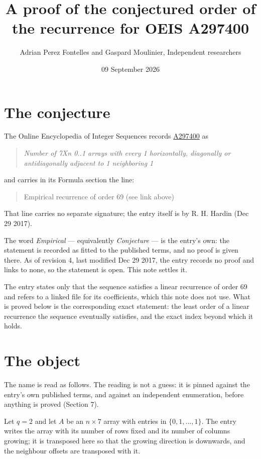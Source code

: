 \documentclass[11pt]{article}
\title{A proof of the conjectured order of the recurrence for OEIS A297400}
\author{Adrian Perez Fontelles and Gaspard Moulinier, Independent researchers}
\date{09 September 2026}
\theoremstyle{definition}
\begin{document}
\maketitle
\section{The conjecture}

The Online Encyclopedia of Integer Sequences records \href{https://oeis.org/A297400}{A297400} as

\begin{quote}\itshape Number of 7Xn 0..1 arrays with every 1 horizontally, diagonally or antidiagonally adjacent to 1 neighboring 1\end{quote}

and carries in its Formula section the line:

\begin{quote}\ttfamily Empirical recurrence of order 69 (see link above)\end{quote}

That line carries no separate signature; the entry itself is by R. H. Hardin (Dec 29 2017).

The word {\itshape Empirical} --- equivalently {\itshape Conjecture} --- is the entry's own: the statement is recorded as fitted to the published terms, and no proof is given there. As of revision 4, last modified Dec 29 2017, the entry records no proof and links to none, so the statement is open. This note settles it.

The entry states only that the sequence satisfies a linear recurrence of order $69$ and refers to a linked file for its coefficients, which this note does not use. What is proved below is the corresponding exact statement: the least order of a linear recurrence the sequence eventually satisfies, and the exact index beyond which it holds.

\section{The object}

The name is read as follows. The reading is not a guess: it is pinned against the entry's own published terms, and against an independent enumeration, before anything is proved (Section 7).

Let $q = 2$ and let $A$ be an $n \times 7$ array with entries in $\{0,1,\dots,1\}$. The entry writes the array with its number of rows fixed and its number of columns growing; it is transposed here so that the growing direction is downwards, and the neighbour offsets are transposed with it.
\end{document}
